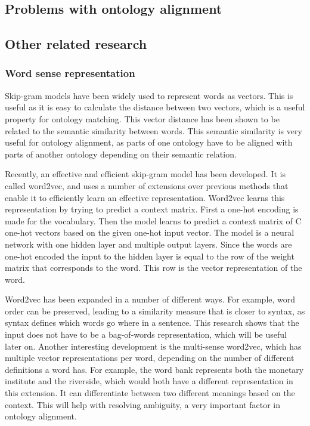 \documentclass{article}
\begin{document}
 \subsection{Problems with ontology alignment}
 \subsection{Other related research}
 \subsubsection{Word sense representation}
 Skip-gram models have been widely used to represent words as vectors. This is useful as it is easy to calculate the distance between two vectors, which is a useful property for ontology matching. This vector distance has been shown to be related to the semantic similarity between words. This semantic similarity is very useful for ontology alignment, as parts of one ontology have to be aligned with parts of another ontology depending on their semantic relation.
 
 Recently, an effective and efficient skip-gram model has been developed. It is called word2vec, and uses a number of extensions over previous methods that enable it to efficiently learn an effective representation.
  Word2vec learns this representation by trying to predict a context matrix. First a one-hot encoding is made for the vocabulary. Then the model learns to predict a context matrix of C one-hot vectors based on the given one-hot input vector. The model is a neural network with one hidden layer and multiple output layers. Since the words are one-hot encoded the input to the hidden layer is equal to the row of the weight matrix that corresponds to the word. This row is the vector representation of the word.
 
 Word2vec has been expanded in a number of different ways. For example, word order can be preserved, leading to a similarity measure that is closer to syntax, as syntax defines which words go where in a sentence. This research shows that the input does not have to be a bag-of-words representation, which will be useful later on. %
 Another interesting development is the multi-sense word2vec, which has multiple vector representations per word, depending on the number of different definitions a word has. For example, the word bank represents both the monetary institute and the riverside, which would both have a different representation in this extension. It can differentiate between two different meanings based on the context. This will help with resolving ambiguity, a very important factor in ontology alignment.
\end{document}

